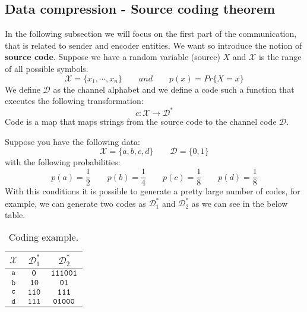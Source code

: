 \subsection{Data compression - Source coding theorem}
In the following subsection we will focus on the first part of the communication, that is related to sender and encoder entities. We want so introduce the notion of \textbf{source code}.
Suppose we have a random variable (source) $X$ and $\mathcal{X}$ is the range of all possible symbols.
$$\mathcal{X} = \{x_1, \cdots, x_n\} \qquad and \qquad p(x) = Pr\{X=x\}$$
We define $\mathcal{D}$ as the channel alphabet and we define a code such a function that executes the following transformation:
$$c : \mathcal{X} \rightarrow \mathcal{D}^*$$
Code is a map that maps strings from the source code to the channel code $\mathcal{D}$.
\begin{exmp} Suppose you have the following data:
	$$\mathcal{X} = \{a, b, c, d\} \qquad \mathcal{D} = \{0,1\}$$
	with the following probabilities:
	$$p(a) = \frac{1}{2} \qquad p(b) = \frac{1}{4} \qquad p(c) = \frac{1}{8} \qquad p(d) = \frac{1}{8}$$
	With this conditions it is possible to generate a pretty large number of codes, for example, we can generate two codes as $\mathcal{D}^*_1$ and $\mathcal{D}^*_2$ as we can see in the below table.
	\begin{table}[H]
		\centering
		\begin{tabular}{| c | c | c |}
			\hline
			$\mathcal{X}$ & $\mathcal{D}^*_1$ & $\mathcal{D}^*_2$\\\hline
			$\verb|a|$ & $\verb|0|$ & $\verb|111001|$ \\
			$\verb|b|$ & $\verb|10|$ & $\verb|01|$ \\
			$\verb|c|$ & $\verb|110|$ & $\verb|111|$ \\
			$\verb|d|$ & $\verb|111|$ & $\verb|01000|$ \\
			\hline
		\end{tabular}
		\caption{Coding example.}
	\end{table}
\end{exmp}

